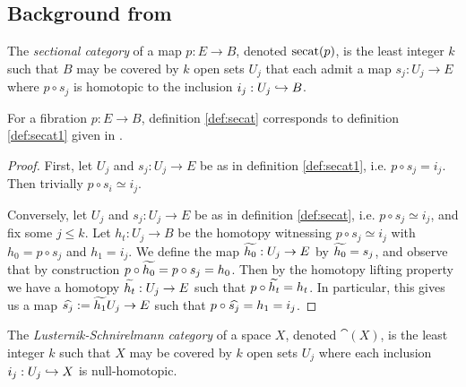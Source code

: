 \subsection{Background from \cite{colman2013equivariant}}\label{sec:bg-colman}

\begin{definition}\label{def:secat}
    The \emph{sectional category} of a map $p : E \to B$, denoted $\secat(p)$, is the least integer $k$ such that $B$ may be covered by $k$ open sets $U_j$ that each admit a map $s_j : U_j \to E$ where $p \circ s_j$ is homotopic to the inclusion $i_j : U_j \ito B$.
\end{definition}

\begin{remark}\label{rem:secat-def-equivalence}
    For a fibration $p : E \to B$, definition \ref{def:secat} corresponds to definition \ref{def:secat1} given in \cite{farber2006topology}.
    \begin{proof}
        First, let $U_j$ and $s_j : U_j \to E$ be as in definition \ref{def:secat1}, i.e. $p \circ s_j = i_j$.
        Then trivially $p \circ s_i \simeq i_j$.
        
        Conversely, let $U_j$ and $s_j : U_j \to E$ be as in definition \ref{def:secat}, i.e. $p \circ s_j \simeq i_j$, and fix some $j \leq k$.
        Let $h_t : U_j \to B$ be the homotopy witnessing $p \circ s_j \simeq i_j$ with $h_0 = p \circ s_j$ and $h_1 = i_j$.
        We define the map $\Tilde{h_0} : U_j \to E$ by $\Tilde{h_0} = s_j$, and observe that by construction $p \circ \Tilde{h_0} = p \circ s_j = h_0$.
        Then by the homotopy lifting property we have a homotopy $\Tilde{h_t} : U_j \to E$ such that $p \circ \Tilde{h_t} = h_t$.
        In particular, this gives us a map $\Hat{s_j} := \Tilde{h_1} U_j \to E$ such that $p \circ \Hat{s_j} = h_1 = i_j$.
    \end{proof}
\end{remark}

\begin{definition}\label{def:LScat}
    The \emph{Lusternik-Schnirelmann category} of a space $X$, denoted $\cat(X)$, is the least integer $k$ such that $X$ may be covered by $k$ open sets $U_j$ where each inclusion $i_j : U_j \ito X$ is null-homotopic.
\end{definition}

